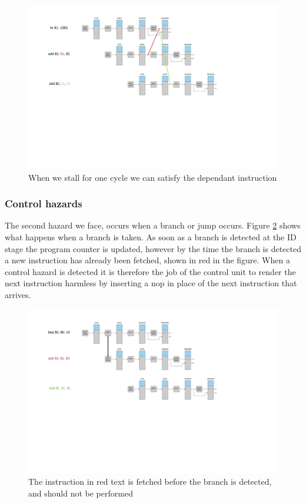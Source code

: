 \begin{figure}[h!]
    \includegraphics[width=\linewidth]{img/lw_hazard_handled.png}
    \caption{When we stall for one cycle we can satisfy the dependant instruction}
    \label{fig:hazard2}
\end{figure}

\subsubsection{Control hazards}
The second hazard we face, occurs when a branch or jump occurs. Figure \ref{fig:ctrl1} shows what happens when a branch is taken.
As soon as a branch is detected at the ID stage the program counter is updated, however by the time the branch is detected a new instruction has already been fetched, shown in red in the figure.
When a control hazard is detected it is therefore the job of the control unit to render the next instruction harmless by inserting a nop in place of the next instruction that arrives.

\begin{figure}[h!]
    \includegraphics[width=\linewidth]{img/ctrl_haz.png}
    \caption{The instruction in red text is fetched before the branch is detected, and should not be performed}
    \label{fig:ctrl1}
\end{figure}
